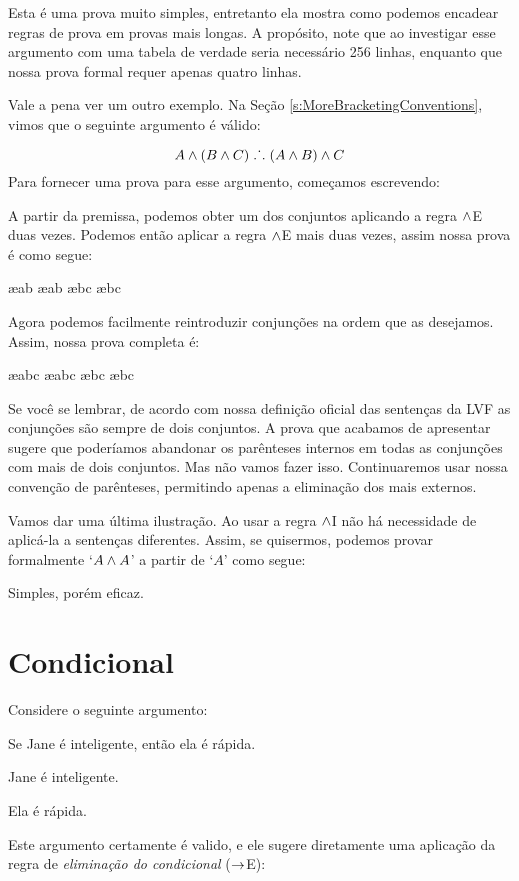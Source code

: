  Esta é uma prova muito simples, entretanto ela mostra como podemos encadear regras de  prova em provas mais longas.  A propósito, note que ao investigar esse argumento com uma tabela de verdade seria necessário 256 linhas, enquanto que nossa prova formal requer apenas quatro linhas.

Vale a pena ver um outro exemplo.  Na Seção   \ref{s:MoreBracketingConventions}, vimos  que o seguinte  argumento é válido:

	$$A \wedge (B \wedge C) \mathrel{\ldotp\dot{}\,\ldotp} (A \wedge B) \wedge C$$
 Para fornecer uma prova para esse argumento,  começamos escrevendo: 
\begin{fitchproof}
\end{fitchproof}
 A partir da premissa, podemos obter um dos conjuntos aplicando a regra $\wedge$E duas vezes. Podemos então aplicar a regra $\wedge$E mais duas vezes,  assim nossa prova é como segue: 
\begin{fitchproof}
	 \ae{ab}
	 \ae{ab}
	 \ae{bc}
	 \ae{bc}
\end{fitchproof}
 Agora podemos facilmente reintroduzir conjunções na ordem que as desejamos. Assim, nossa prova  completa é:
 
\begin{fitchproof}
	 \ae{abc}
	 \ae{abc}
	 \ae{bc}
	 \ae{bc}
\end{fitchproof}
Se você se lembrar, de acordo com nossa definição oficial das sentenças da LVF as conjunções são sempre de dois conjuntos. A prova que acabamos de apresentar sugere que poderíamos abandonar os parênteses internos em todas as conjunções com mais de dois conjuntos. Mas não vamos fazer isso. Continuaremos usar nossa convenção de parênteses, permitindo apenas a eliminação dos mais externos.

Vamos dar uma última ilustração. Ao usar a regra $\wedge$I 
não há necessidade de aplicá-la a sentenças diferentes.
Assim, se quisermos, podemos provar formalmente  `$A \wedge A$' a partir de `$A$' como  segue:
\begin{fitchproof}
\end{fitchproof}
Simples, porém eficaz.

\section{Condicional}
Considere o seguinte argumento:
\begin{earg}
		\item[] Se Jane é inteligente, então ela é rápida.
		\item[] Jane é inteligente.
		\item[\therefore] Ela é rápida.
\end{earg}
Este argumento certamente é valido, e ele sugere diretamente uma aplicação da  regra de \textit{eliminação do condicional}  ($\rightarrow$E):
 
